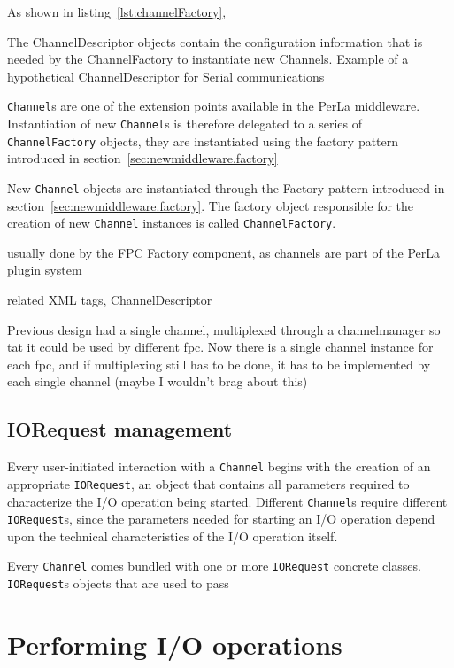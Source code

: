 As shown in listing~\ref{lst:channelFactory}, 

The ChannelDescriptor objects contain the configuration information that is needed by the ChannelFactory to instantiate new Channels.
Example of a hypothetical ChannelDescriptor for Serial communications

\texttt{Channel}s are one of the extension points available in the PerLa middleware. Instantiation of new \texttt{Channel}s is therefore delegated to a series of \texttt{ChannelFactory} objects, they are instantiated using the factory pattern introduced in section~\ref{sec:newmiddleware.factory}

New \texttt{Channel} objects are instantiated through the Factory pattern introduced in section~\ref{sec:newmiddleware.factory}. The factory object responsible for the creation of new \texttt{Channel} instances is called \texttt{ChannelFactory}.





usually done by the FPC Factory component, as channels are part of the PerLa plugin system

related XML tags, ChannelDescriptor

Previous design had a single channel, multiplexed through a channelmanager so tat it could be used by different fpc. Now there is a single channel instance for each fpc, and if multiplexing still has to be done, it has to be implemented by each single channel (maybe I wouldn't brag about this)


\subsection{IORequest management}

Every user-initiated interaction with a \texttt{Channel} begins with the creation of an appropriate \texttt{IORequest}, an object that contains all parameters required to characterize the I/O operation being started. Different \texttt{Channel}s require different \texttt{IORequest}s, since the parameters needed for starting an I/O operation depend upon the technical characteristics of the I/O operation itself.


Every \texttt{Channel} comes bundled with one or more \texttt{IORequest} concrete classes. \texttt{IORequest}s objects that are used to pass





\section{Performing I/O operations}


